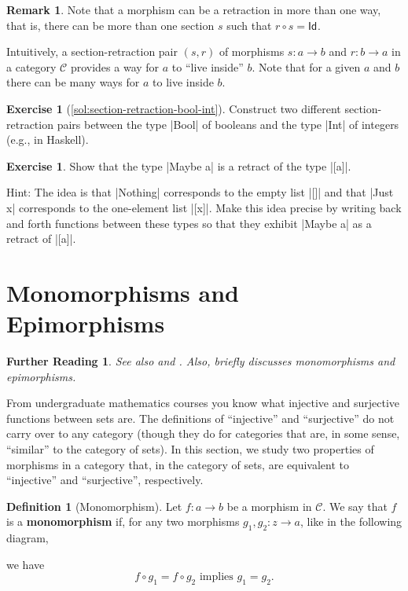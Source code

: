 \documentclass[a4paper,11pt, oneside,titlepage=false]{scrbook}
\theoremstyle{plain}
\newtheorem*{reading*}{Further Reading}
\theoremstyle{definition}
\newtheorem{rem}[thm]{Remark}
\newtheorem{dfn}[thm]{Definition}
\newtheorem{exer}[thm]{Exercise}
\newcommand{\cfont}[1]{\ensuremath{\mathsf{#1}}}
\newcommand{\Cat}[1]{\mathcal{#1}}
\newcommand{\CC}{\Cat{C}}
\newcommand{\Id}[1][]{\cfont{Id}_{#1}}
\newcommand{\co}[2]{\ensuremath{#2 \circ #1}}
\begin{document}
\begin{rem}
  Note that a morphism can be a retraction in more than one way, that is, there can be more than one section $s$ such that $\co{s}{r} = \Id$.
\end{rem}

Intuitively, a section-retraction pair $(s,r)$ of morphisms $s : a \to b$ and $r : b \to a$ in a category $\CC$ provides a way for $a$ to ``live inside'' $b$.
Note that for a given $a$ and $b$ there can be many ways for $a$ to live inside $b$.

\begin{exer}[\cref{sol:section-retraction-bool-int}]\label{exer:section-retraction-bool-int}
  Construct two different section-retraction pairs between the type |Bool| of booleans and the type |Int| of integers (e.g., in Haskell).
\end{exer}



\begin{exer}
 Show that the type |Maybe a| is a retract of the type |[a]|. 
 
 Hint: The idea is that |Nothing| corresponds to the empty list |[]| and that |Just x| corresponds to the one-element list |[x]|. Make this idea precise by writing back and forth functions between these types so that they exhibit |Maybe a| as a retract of |[a]|. 
\end{exer}


\section{Monomorphisms and Epimorphisms}
\label{sec:mono-epi}

\begin{reading*}
See also \cite[p. 134]{leinster} and \cite[\S\S 2.8--2.9]{barr-wells}.
Also, \cite[\S 2.2]{pierce} briefly discusses monomorphisms and epimorphisms.
\end{reading*}

From undergraduate mathematics courses you know what injective and surjective functions between sets are.
The definitions of ``injective'' and ``surjective'' do not carry over to any category (though they do for categories that are, in some sense, ``similar'' to the category of sets).
In this section, we study two properties of morphisms in a category that, in the category of sets, are equivalent to ``injective'' and ``surjective'', respectively.



\begin{dfn}[Monomorphism]
  Let $f : a \to b$ be a morphism in $\CC$. We say that $f$ is a \textbf{monomorphism} if, for any two morphisms $g_1, g_2 : z \to a$, like in the following diagram,
  \begin{center}
  \end{center}
  we have
  \[ \co{g_1}{f} = \co{g_2}{f} \text{ implies } g_1 = g_2 .\]
\end{dfn}
\end{document}
